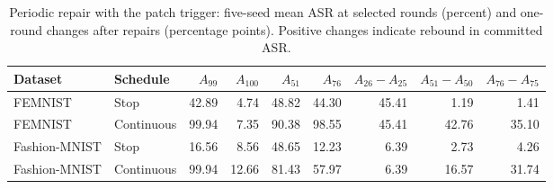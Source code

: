 \begin{table}[t]
\caption{Periodic repair with the patch trigger: five-seed mean ASR at selected rounds (percent) and one-round changes after repairs (percentage points). Positive changes indicate rebound in committed ASR.}
\label{tab:phases}
\centering\small\begin{tabular}{llrrrrrrr}
\toprule
Dataset & Schedule & $A_{99}$ & $A_{100}$ & $A_{51}$ & $A_{76}$ & $A_{26}-A_{25}$ & $A_{51}-A_{50}$ & $A_{76}-A_{75}$ \\
\midrule
FEMNIST & Stop & 42.89 & 4.74 & 48.82 & 44.30 & 45.41 & 1.19 & 1.41 \\
FEMNIST & Continuous & 99.94 & 7.35 & 90.38 & 98.55 & 45.41 & 42.76 & 35.10 \\
Fashion-MNIST & Stop & 16.56 & 8.56 & 48.65 & 12.23 & 6.39 & 2.73 & 4.26 \\
Fashion-MNIST & Continuous & 99.94 & 12.66 & 81.43 & 57.97 & 6.39 & 16.57 & 31.74 \\
\bottomrule\end{tabular}
\end{table}
